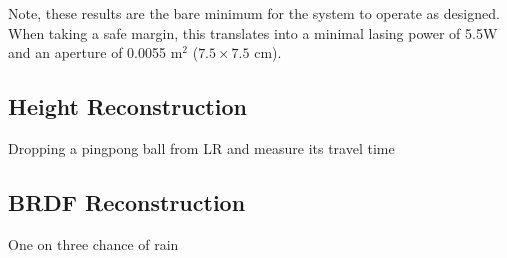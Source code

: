 Note, these results are the bare minimum for the system to operate as designed. When taking a safe margin, this translates into a minimal lasing power of 5.5W and an aperture of 0.0055 m$^2$ ($7.5\times7.5$ cm). 

\subsection{Height Reconstruction}
\label{sec:HeightReconstruction}

Dropping a pingpong ball from LR and measure its travel time

\subsection{BRDF Reconstruction}
\label{sec:BRDFReconstuction}

One on three chance of rain


